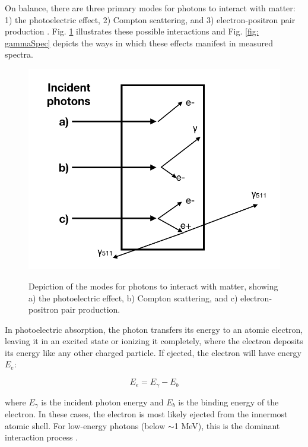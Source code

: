 On balance, there are three primary modes for photons to interact with matter: 1) the photoelectric effect, 2) Compton scattering, and 3) electron-positron pair production \cite{KnollBook}. Fig. \ref{fig: radiationInteraction} illustrates these possible interactions and Fig. \ref{fig: gammaSpec} depicts the ways in which these effects manifest in measured spectra. 


\begin{figure}
\centering
\includegraphics[width=0.8\linewidth]{figures/photonInteraction.png}
\label{fig: radiationInteraction}
\caption{Depiction of the modes for photons to interact with matter, showing a) the photoelectric effect, b) Compton scattering, and c) electron-positron pair production. }
\end{figure}


In photoelectric absorption, the photon transfers its energy to an atomic electron, leaving it in an excited state or ionizing it completely, where the electron deposits its energy like any other charged particle. If ejected, the electron will have energy $E_{e}$:

\begin{equation}
E_{e} = E_{\gamma} - E_{b}
\end{equation} 

\noindent where $E_{\gamma}$ is the incident photon energy and $E_{b}$ is the binding energy of the electron. In these cases, the electron is most likely ejected from the innermost atomic shell. For low-energy photons (below $\sim$1 MeV), this is the dominant interaction process \cite{KnollBook}. 

